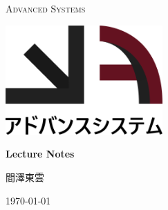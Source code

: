 \documentclass[a4paper]{article}
\begin{document}
\begin{titlepage}
    \centering
    {\scshape\Huge Advanced Systems \par}
    \par\vspace{1cm}
    \includegraphics[width=0.45\textwidth]{images/logo.png}\par
    \vspace{3cm}
    {\huge\bfseries Lecture Notes \par}
    \vspace{1cm}
    \begin{CJK}{UTF8}{song}
        {\LARGE 間澤東雲 \par}
    \end{CJK}
    \vspace{1cm}
    {\large\today\par}
    \vfill
    \begin{abstract}
        This document is a compilation of lecture notes for intermediate mathematics.
        It is intended to serve as a study guide for members of the Advanced System
        organization.
    \end{abstract}
\end{titlepage}

\newpage

\printnoidxglossary[type=\acronymtype]

\newpage

\tableofcontents

\newpage









\newpage

\medskip
\printbibliography
\end{document}
